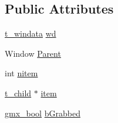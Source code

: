 \subsection*{\-Public \-Attributes}
\begin{DoxyCompactItemize}
\item 
\hyperlink{structt__windata}{t\-\_\-windata} \hyperlink{structt__menu_a5393542f75525e3bd0def5612c201fac}{wd}
\item 
\-Window \hyperlink{structt__menu_a73ff7e7653f9f4fb9af5617fd953b327}{\-Parent}
\item 
int \hyperlink{structt__menu_ac8235161b3b5e70c8d65e4153ddf4a36}{nitem}
\item 
\hyperlink{structt__child}{t\-\_\-child} $\ast$ \hyperlink{structt__menu_a6451658b45184306266c3be02f578cf1}{item}
\item 
\hyperlink{include_2types_2simple_8h_a8fddad319f226e856400d190198d5151}{gmx\-\_\-bool} \hyperlink{structt__menu_aeeb6a68461bb330c64137211a4114fd6}{b\-Grabbed}
\end{DoxyCompactItemize}



